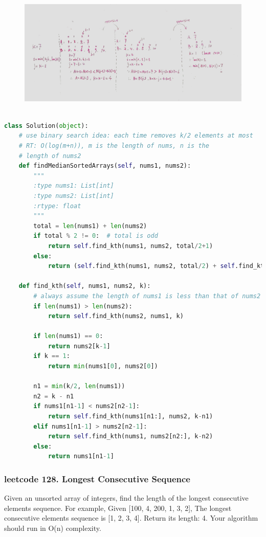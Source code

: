 \documentclass[a4paper,10pt]{article}
\begin{document}
\begin{figure}[h]
    \includegraphics[width=\textwidth]{leetcode4.jpg}
    \centering
\end{figure}

\begin{lstlisting}[language=Python, caption=Problem4. Median of Two Sorted Arrays]

class Solution(object):
    # use binary search idea: each time removes k/2 elements at most
    # RT: O(log(m+n)), m is the length of nums, n is the 
    # length of nums2
    def findMedianSortedArrays(self, nums1, nums2): 
        """
        :type nums1: List[int]
        :type nums2: List[int]
        :rtype: float
        """
        total = len(nums1) + len(nums2)
        if total % 2 != 0:  # total is odd
            return self.find_kth(nums1, nums2, total/2+1)
        else:
            return (self.find_kth(nums1, nums2, total/2) + self.find_kth(nums1, nums2, total/2+1)) / 2.0
        
    def find_kth(self, nums1, nums2, k):
        # always assume the length of nums1 is less than that of nums2
        if len(nums1) > len(nums2):
            return self.find_kth(nums2, nums1, k)
        
        if len(nums1) == 0:
            return nums2[k-1]
        if k == 1:
            return min(nums1[0], nums2[0])
        
        n1 = min(k/2, len(nums1))
        n2 = k - n1
        if nums1[n1-1] < nums2[n2-1]:
            return self.find_kth(nums1[n1:], nums2, k-n1)
        elif nums1[n1-1] > nums2[n2-1]:
            return self.find_kth(nums1, nums2[n2:], k-n2)
        else:
            return nums1[n1-1]
\end{lstlisting}



\subsubsection{leetcode 128. Longest Consecutive Sequence}
Given an unsorted array of integers, find the length of the longest consecutive elements sequence. For example, Given [100, 4, 200, 1, 3, 2], The longest consecutive elements sequence is [1, 2, 3, 4]. Return its length: 4. Your algorithm should run in O(n) complexity.\\
\end{document}
